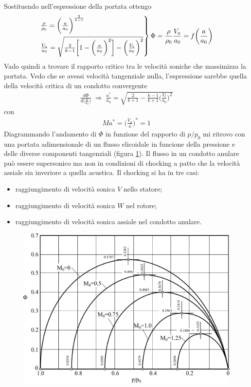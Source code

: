 Sostituendo nell'espressione della portata ottengo
\begin{align*}
\begin{rcases*}
\frac{\rho}{\rho_0} = \bigg( \frac{a}{a_0} \bigg)^{\frac{2}{k-1}}\\
\frac{V_a}{a_0} = \sqrt{\frac{2}{k-1} \bigg[ 1- \bigg( \frac{a}{a_0} \bigg)^2 \bigg] - \bigg( \frac{V_t}{a_0} \bigg)^2}
\end{rcases*}
\Phi = \frac{\rho}{\rho_0} \frac{V_a}{a_0} = f \bigg( \frac{a}{a_0} \bigg)
\end{align*}
Vado quindi a trovare il rapporto critico tra le velocità soniche che massimizza la portata. Vedo che se avessi velocità tangenziale nulla, l'espressione sarebbe quella della velocità critica di un condotto convergente
\begin{align*}
\frac{d\Phi}{d \bigg( \frac{a}{a_0} \bigg)} \; \Rightarrow \; \boxed{ \frac{a^*}{a_0} = \sqrt{\frac{2}{k+1} - \frac{k-1}{k+1} \bigg( \frac{V_t}{a_0} \bigg)^2} }
\end{align*}
con
\begin{align*}
Ma^* = \bigg( \frac{V_a}{a} \bigg)^* = 1
\end{align*}
Diagrammando l'andamento di $\Phi$ in funzione del rapporto di $p/p_0$ mi ritrovo con una portata adimensionale di un flusso elicoidale in funcione della pressione e delle diverse componenti tangenziali (figura \ref{fd:PortCondAn}). Il flusso in un condotto anulare può essere supersonico ma non in condizioni di chocking a patto che la velocità assiale sia inveriore a quella acustica. Il chocking si ha in tre casi:
\begin{itemize}
\item raggiungimento di velocità sonica $V$ nello statore;
\item raggiungimento di velocità sonica $W$ nel rotore;
\item raggiungimento di velocità sonica assiale nel condotto anulare.
\end{itemize}
\begin{figure}
\centering
  \includegraphics[width=.7\textwidth]{fig/PortCondAn.pdf}
\caption{}
\label{fd:PortCondAn}
\end{figure}
